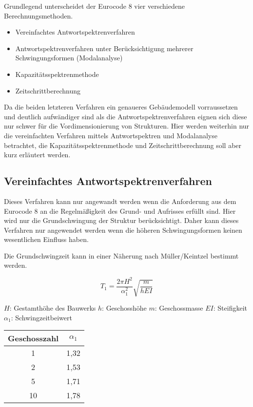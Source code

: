 Grundlegend unterscheidet der Eurocode 8 vier verschiedene Berechnungsmethoden.

\begin{itemize}
  \item Vereinfachtes Antwortspektrenverfahren
  \item Antwortspektrenverfahren unter Berücksichtigung mehrerer Schwingungsformen (Modalanalyse)
  \item Kapazitätsspektrenmethode
  \item Zeitschrittberechnung
\end{itemize}

Da die beiden letzteren Verfahren ein genaueres Gebäudemodell vorraussetzen und deutlich aufwändiger sind als die Antwortspektrenverfahren eignen sich diese nur schwer für die Vordimensionierung von Strukturen. 
Hier werden weiterhin nur die vereinfachten Verfahren mittels Antwortspektren und Modalanalyse betrachtet, die Kapazitätsspektrenmethode und Zeitschrittberechnung soll aber kurz erläutert werden.

\subsection{Vereinfachtes Antwortspektrenverfahren}
\label{sec:Antwortspektrenverfahren}

Dieses Verfahren kann nur angewandt werden wenn die Anforderung aus dem Eurocode 8 an die Regelmäßigkeit des Grund- und Aufrisses erfüllt sind.
Hier wird nur die Grundschwingung der Struktur berücksichtigt. Daher kann dieses Verfahren nur angewendet werden wenn die höheren Schwingungsformen keinen wesentlichen Einfluss haben.

Die Grundschwingzeit kann in einer Näherung nach Müller/Keintzel bestimmt werden.

\begin{equation*}
T_1 = \frac{2 \pi H^2}{\alpha_1^2}\sqrt{\frac{m}{hEI}}
\end{equation*}

\thinspace

\begin{multicols}{2}
$H$: Gestamthöhe des Bauwerks \newline
$h$: Geschosshöhe \newline
$m$: Geschossmasse \newline
$EI$: Steifigkeit \newline 
$\alpha_1$: Schwingzeitbeiwert \newline
\columnbreak
\begin{flushright}
\begin{tabular}{ |c|c| } 
 \hline
 Geschosszahl & $\alpha_1$ \\
 \hline\hline
 1 & 1,32 \\ 
 2 & 1,53 \\ 
 5 & 1,71 \\ 
 10 & 1,78 \\ 
 \hline
\end{tabular}
\end{flushright}
\end{multicols}

